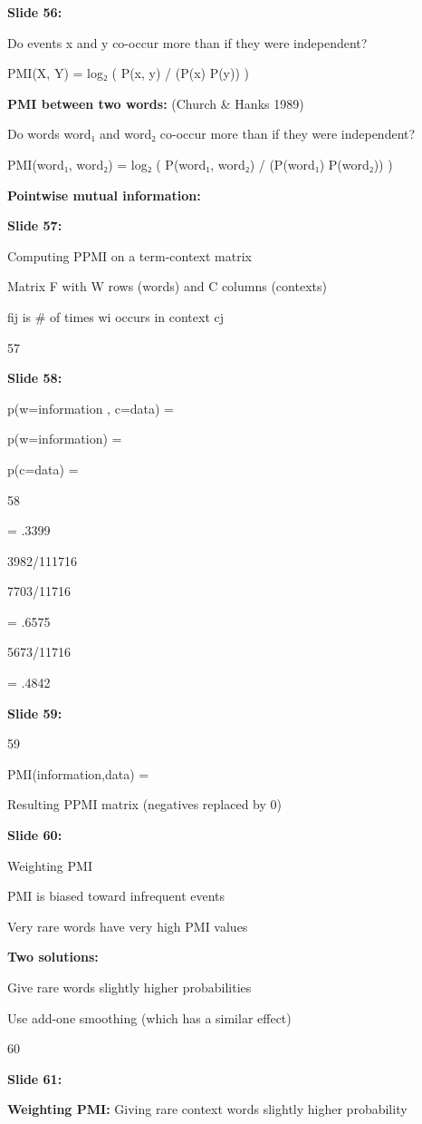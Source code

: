 \documentclass[11pt,a4paper]{article}
\begin{document}
\textbf{Slide 56:}

Do events x and y co-occur more than if they were independent?

PMI(X, Y) = log₂ ( P(x, y) / (P(x) P(y)) )

\textbf{PMI between two words:}  (Church \& Hanks 1989)

Do words word₁ and word₂ co-occur more than if they were independent?

PMI(word₁, word₂) = log₂ ( P(word₁, word₂) / (P(word₁) P(word₂)) )

\textbf{Pointwise mutual information:} 

\textbf{Slide 57:}

Computing PPMI on a term-context matrix

Matrix F with W rows (words) and C columns (contexts)

fij is \# of times wi occurs in context cj

57

\textbf{Slide 58:}

p(w=information , c=data) =

p(w=information) =

p(c=data) =

58

= .3399

3982/111716

7703/11716

= .6575

5673/11716

= .4842

\textbf{Slide 59:}

59

PMI(information,data) =

Resulting PPMI matrix (negatives replaced by 0)

\textbf{Slide 60:}

Weighting PMI

PMI is biased toward infrequent events

Very rare words have very high PMI values

\textbf{Two solutions:} 

Give rare words slightly higher probabilities

Use add-one smoothing (which has a similar effect)

60

\textbf{Slide 61:}

\textbf{Weighting PMI:}  Giving rare context words slightly higher probability
\end{document}
